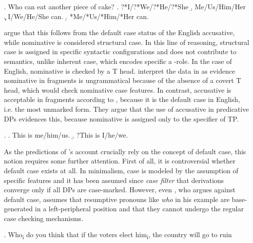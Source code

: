 \ex. Who can eat another piece of cake? \hfill \citep[77]{barton.progovac2005} \label{ex:barton.cake}
\a. ?*I/?*We/?*He/?*She
\b. Me/Us/Him/Her
\c. I/We/He/She can.
\d. *Me/*Us/*Him/*Her can.

\citeauthor{barton.progovac2005} argue that this follows from the default case status of the English accusative, while nominative is considered structural case. In this line of reasoning, structural case is assigned in specific syntactic configurations and does not contribute to semantics, unlike inherent case, which encodes specific a \texttheta-role. In the case of English, nominative is checked by a T head. \citet{barton.progovac2005} interpret the data in \Last as evidence nominative in fragments is ungrammatical because of the absence of a covert T head, which would check nominative case features. In contrast, accusative is acceptable in fragments according to \citet[78]{barton.progovac2005}, because it is the default case in English, i.e. the most unmarked form. They argue that the use of accusative in predicative DPs \Next evidences this, because nominative is assigned only to the specifier of TP.

\ex. \a. This is me/him/us.\hfill \citep[79]{barton.progovac2005}
    \b. ?This is I/he/we.

As the predictions of \citeauthor{barton.progovac2005}'s account crucially rely on the concept of default case, this notion requires some further attention. First of all, it is controversial whether default case exists at all. In minimalism, case is modeled by the assumption of specific features and it has been assumed since  \textit{case filter} that derivations converge only if all DPs are case-marked. However, even \citet{merchant2004a}, who argues against default case, assumes that resumptive pronouns like \textit{who} in his example \Next are base-generated in a left-peripheral position and that they cannot undergo the regular case checking mechanisms. 

\ex. Who\textsubscript{i} do you think that if the voters elect him\textsubscript{i}, the country will go to ruin

